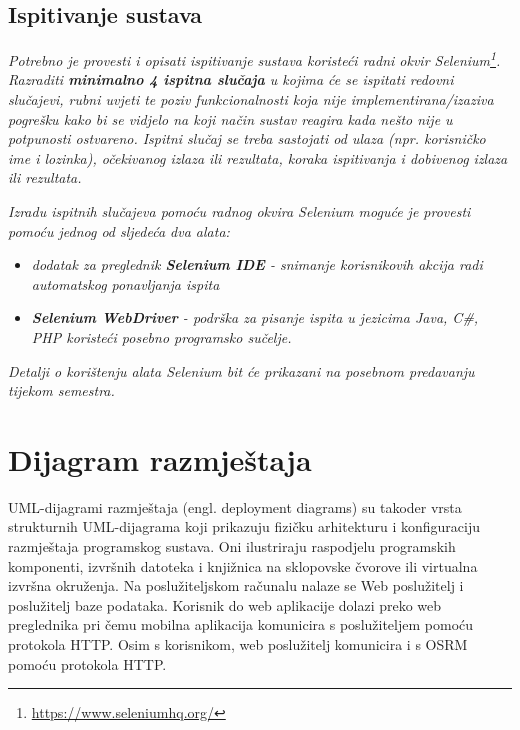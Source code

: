 \subsection{Ispitivanje sustava}

\textit{Potrebno je provesti i opisati ispitivanje sustava koristeći radni okvir Selenium\footnote{\url{https://www.seleniumhq.org/}}. Razraditi \textbf{minimalno 4 ispitna slučaja} u kojima će se ispitati redovni slučajevi, rubni uvjeti te poziv funkcionalnosti koja nije implementirana/izaziva pogrešku kako bi se vidjelo na koji način sustav reagira kada nešto nije u potpunosti ostvareno. Ispitni slučaj se treba sastojati od ulaza (npr. korisničko ime i lozinka), očekivanog izlaza ili rezultata, koraka ispitivanja i dobivenog izlaza ili rezultata.\\ }

\textit{Izradu ispitnih slučajeva pomoću radnog okvira Selenium moguće je provesti pomoću jednog od sljedeća dva alata:}
\begin{itemize}
	\item \textit{dodatak za preglednik \textbf{Selenium IDE} - snimanje korisnikovih akcija radi automatskog ponavljanja ispita	}
	\item \textit{\textbf{Selenium WebDriver} - podrška za pisanje ispita u jezicima Java, C\#, PHP koristeći posebno programsko sučelje.}
\end{itemize}
\textit{Detalji o korištenju alata Selenium bit će prikazani na posebnom predavanju tijekom semestra.}

\eject 


\section{Dijagram razmještaja}


UML-dijagrami razmještaja (engl. deployment diagrams) su takoder vrsta strukturnih UML-dijagrama koji prikazuju fizičku arhitekturu i konfiguraciju razmještaja programskog sustava. Oni ilustriraju raspodjelu programskih komponenti, izvršnih datoteka i knjižnica na sklopovske čvorove ili virtualna izvršna okruženja.
Na poslužiteljskom računalu nalaze se Web poslužitelj i poslužitelj baze podataka. Korisnik do web aplikacije dolazi preko web preglednika pri čemu mobilna aplikacija komunicira s poslužiteljem pomoću protokola HTTP. Osim s korisnikom, web poslužitelj komunicira i s OSRM pomoću protokola HTTP.

\vspace{5cm}

